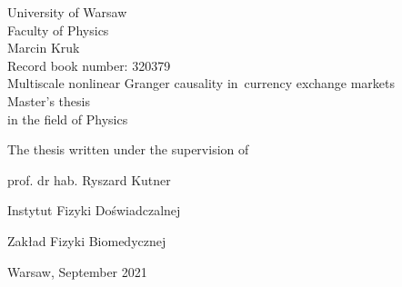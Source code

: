 \thispagestyle{empty}
\vspace*{2cm}
\begin{center}
{\huge University of Warsaw\\ \vspace{0.3cm}
Faculty of Physics}\\
\vspace{1.5cm}
Marcin Kruk\\
Record book number: 320379\\
\vspace{1.5cm}
{\huge Multiscale nonlinear Granger causality \mbox{in currency} exchange markets}\\
\vspace{2cm}
Master's thesis\\
in the field of Physics
\end{center}
\vspace{3cm}
\hfill The thesis written under the supervision of\vspace{0.2cm}

\hfill prof. dr hab. Ryszard Kutner

\hfill Instytut Fizyki Doświadczalnej

\hfill Zakład Fizyki Biomedycznej
\vfill
\begin{center}
{\large Warsaw, September 2021}\\
\end{center}
